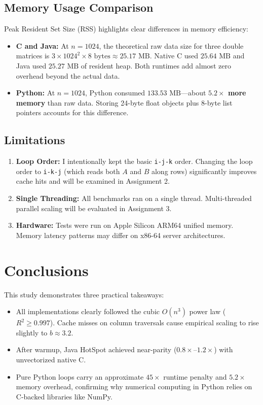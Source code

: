 \documentclass[10pt,conference,a4paper]{IEEEtran}
\begin{document}
\subsection{Memory Usage Comparison}
Peak Resident Set Size (RSS) highlights clear differences in memory efficiency:
\begin{itemize}
    \item \textbf{C and Java:} At $n=1024$, the theoretical raw data size for three double matrices is $3 \times 1024^2 \times 8\text{ bytes} \approx 25.17\text{ MB}$. Native C used $25.64\text{ MB}$ and Java used $25.27\text{ MB}$ of resident heap. Both runtimes add almost zero overhead beyond the actual data.
    \item \textbf{Python:} At $n=1024$, Python consumed $133.53\text{ MB}$---about \textbf{$5.2\times$ more memory} than raw data. Storing 24-byte float objects plus 8-byte list pointers accounts for this difference.
\end{itemize}

\subsection{Limitations}
\begin{enumerate}
    \item \textbf{Loop Order:} I intentionally kept the basic \texttt{i-j-k} order. Changing the loop order to \texttt{i-k-j} (which reads both $A$ and $B$ along rows) significantly improves cache hits and will be examined in Assignment 2.
    \item \textbf{Single Threading:} All benchmarks ran on a single thread. Multi-threaded parallel scaling will be evaluated in Assignment 3.
    \item \textbf{Hardware:} Tests were run on Apple Silicon ARM64 unified memory. Memory latency patterns may differ on x86-64 server architectures.
\end{enumerate}

\section{Conclusions}
This study demonstrates three practical takeaways:
\begin{itemize}
    \item All implementations clearly followed the cubic $O(n^3)$ power law ($R^2 \ge 0.997$). Cache misses on column traversals cause empirical scaling to rise slightly to $b \approx 3.2$.
    \item After warmup, Java HotSpot achieved near-parity ($0.8\times$--$1.2\times$) with unvectorized native C.
    \item Pure Python loops carry an approximate $45\times$ runtime penalty and $5.2\times$ memory overhead, confirming why numerical computing in Python relies on C-backed libraries like NumPy.
\end{itemize}
\end{document}
